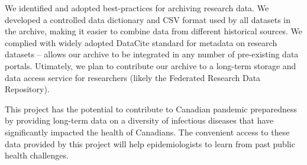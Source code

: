 \documentclass{article}
\begin{document}
We identified and adopted best-practices for archiving research data. We developed a controlled data dictionary and CSV format used by all datasets in the archive, making it easier to combine data from different historical sources. We complied with widely adopted DataCite standard for metadata on research datasets -- allows our archive to be integrated in any number of pre-existing data portals. Utimately, we plan to contribute our archive to a long-term storage and data access service for researchers (likely the Federated Research Data Repository).

This project has the potential to contribute to Canadian pandemic preparedness by providing long-term data on a diversity of infectious diseases that have significantly impacted the health of Canadians. The convenient access to these data provided by this project will help epidemiologists to learn from past public health challenges.

%
%
%
\end{document}
